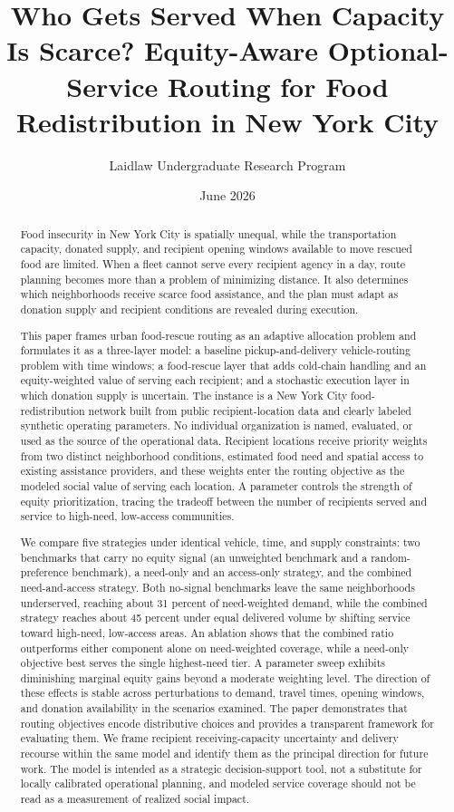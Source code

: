 \documentclass[
  11pt,
]{article}
\title{Who Gets Served When Capacity Is Scarce? Equity-Aware
Optional-Service Routing for Food Redistribution in New York City}
\author{Laidlaw Undergraduate Research Program}
\date{June 2026}
\begin{document}
\maketitle
\begin{abstract}
Food insecurity in New York City is spatially unequal, while the
transportation capacity, donated supply, and recipient opening windows
available to move rescued food are limited. When a fleet cannot serve
every recipient agency in a day, route planning becomes more than a
problem of minimizing distance. It also determines which neighborhoods
receive scarce food assistance, and the plan must adapt as donation
supply and recipient conditions are revealed during execution.

This paper frames urban food-rescue routing as an adaptive allocation
problem and formulates it as a three-layer model: a baseline
pickup-and-delivery vehicle-routing problem with time windows; a
food-rescue layer that adds cold-chain handling and an equity-weighted
value of serving each recipient; and a stochastic execution layer in
which donation supply is uncertain. The instance is a New York City
food-redistribution network built from public recipient-location data
and clearly labeled synthetic operating parameters. No individual
organization is named, evaluated, or used as the source of the
operational data. Recipient locations receive priority weights from two
distinct neighborhood conditions, estimated food need and spatial access
to existing assistance providers, and these weights enter the routing
objective as the modeled social value of serving each location. A
parameter controls the strength of equity prioritization, tracing the
tradeoff between the number of recipients served and service to
high-need, low-access communities.

We compare five strategies under identical vehicle, time, and supply
constraints: two benchmarks that carry no equity signal (an unweighted
benchmark and a random-preference benchmark), a need-only and an
access-only strategy, and the combined need-and-access strategy. Both
no-signal benchmarks leave the same neighborhoods underserved, reaching
about 31 percent of need-weighted demand, while the combined strategy
reaches about 45 percent under equal delivered volume by shifting
service toward high-need, low-access areas. An ablation shows that the
combined ratio outperforms either component alone on need-weighted
coverage, while a need-only objective best serves the single
highest-need tier. A parameter sweep exhibits diminishing marginal
equity gains beyond a moderate weighting level. The direction of these
effects is stable across perturbations to demand, travel times, opening
windows, and donation availability in the scenarios examined. The paper
demonstrates that routing objectives encode distributive choices and
provides a transparent framework for evaluating them. We frame recipient
receiving-capacity uncertainty and delivery recourse within the same
model and identify them as the principal direction for future work. The
model is intended as a strategic decision-support tool, not a substitute
for locally calibrated operational planning, and modeled service
coverage should not be read as a measurement of realized social impact.
\end{abstract}
\end{document}

